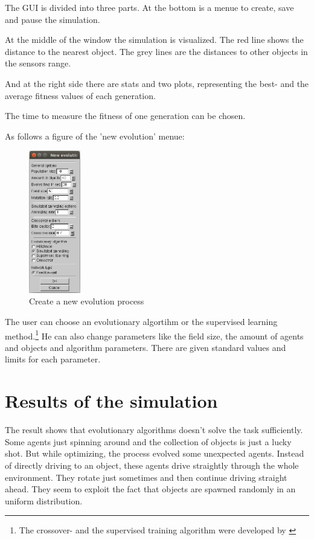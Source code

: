 \documentclass[10pt,a4paper,DIV=11]{scrreprt}
\begin{document}
The GUI is divided into three parts.
At the bottom is a menue to create, save and pause the simulation.

At the middle of the window the simulation is visualized.
The red line shows the distance to the nearest object. The grey lines are the distances to other objects in the sensors range.

And at the right side there are stats and two plots, representing the best- and the average fitness values of each generation.

The time to measure the fitness of one generation can be chosen.

As follows a figure of the 'new evolution' menue:

\begin{center}
	\begin{figure}[H]
		\centering
		\includegraphics[width=0.2\textwidth,scale=1.0]{files/new_graphic_new_ev.png}
		\caption{Create a new evolution process}
		\label{fig:sim-new}
	\end{figure}
\end{center}

The user can choose an evolutionary algortihm or the supervised learning method.\footnote{The crossover- and the supervised training algorithm were developed by \cite{Jona}
}
He can also change parameters like the field size, the amount of agents and objects and algorithm parameters.
There are given standard values and limits for each parameter.
\chapter{Results of the simulation}

The result shows that evolutionary algorithms doesn't solve the task sufficiently. Some agents just spinning around and the collection of objects is just a lucky shot. But while optimizing, the process evolved some unexpected agents. Instead of directly driving to an object, these agents drive straightly through the whole environment. They rotate just sometimes and then continue driving straight ahead. They seem to exploit the fact that objects are spawned randomly in an uniform distribution.
\end{document}
